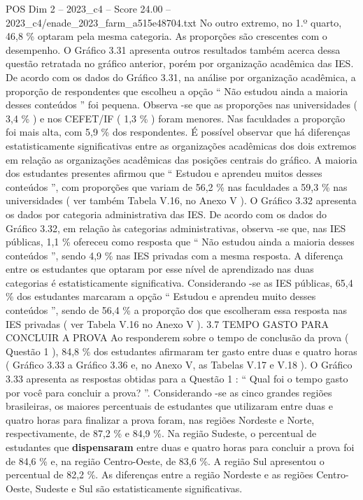 \begin{textsample}{POS Dim 2 – 2023\_c4 – Score 24.00 – 2023\_c4/enade\_2023\_farm\_a515e48704.txt}
No outro extremo, no 1.º quarto, 46,8 \% optaram pela mesma categoria.
As proporções são crescentes com o desempenho.
O Gráfico 3.31 apresenta outros resultados também acerca dessa questão retratada no gráfico anterior, porém por organização acadêmica das IES.
De acordo com os dados do Gráfico 3.31, na análise por organização acadêmica, a proporção de respondentes que escolheu a opção “ Não estudou ainda a maioria desses conteúdos ” foi pequena.
Observa -se que as proporções nas universidades ( 3,4 \% ) e nos CEFET/IF ( 1,3 \% ) foram menores.
Nas faculdades a proporção foi mais alta, com 5,9 \% dos respondentes.
É possível observar que há diferenças estatisticamente significativas entre as organizações acadêmicas dos dois extremos em relação as organizações acadêmicas das posições centrais do gráfico.
A maioria dos estudantes presentes afirmou que “ Estudou e aprendeu muitos desses conteúdos ”, com proporções que variam de 56,2 \% nas faculdades a 59,3 \% nas universidades ( ver também Tabela V.16, no Anexo V ).
O Gráfico 3.32 apresenta os dados por categoria administrativa das IES.
De acordo com os dados do Gráfico 3.32, em relação às categorias administrativas, observa -se que, nas IES públicas, 1,1 \% ofereceu como resposta que “ Não estudou ainda a maioria desses conteúdos ”, sendo 4,9 \% nas IES privadas com a mesma resposta.
A diferença entre os estudantes que optaram por esse nível de aprendizado nas duas categorias é estatisticamente significativa.
Considerando -se as IES públicas, 65,4 \% dos estudantes marcaram a opção “ Estudou e aprendeu muito desses conteúdos ”, sendo de 56,4 \% a proporção dos que escolheram essa resposta nas IES privadas ( ver Tabela V.16 no Anexo V ). 3.7 TEMPO GASTO PARA CONCLUIR A PROVA Ao responderem sobre o tempo de conclusão da prova ( Questão 1 ), 84,8 \% dos estudantes afirmaram ter gasto entre duas e quatro horas ( Gráfico 3.33 a Gráfico 3.36 e, no Anexo V, as Tabelas V.17 e V.18 ).
O Gráfico 3.33 apresenta as respostas obtidas para a Questão 1 : “ Qual foi o tempo gasto por você para concluir a prova? ”.
Considerando -se as cinco grandes regiões brasileiras, os maiores percentuais de estudantes que utilizaram entre duas e quatro horas para finalizar a prova foram, nas regiões Nordeste e Norte, respectivamente, de 87,2 \% e 84,9 \%.
Na região Sudeste, o percentual de estudantes que \textbf{dispensaram} entre duas e quatro horas para concluir a prova foi de 84,6 \% e, na região Centro-Oeste, de 83,6 \%.
A região Sul apresentou o percentual de 82,2 \%.
As diferenças entre a região Nordeste e as regiões Centro-Oeste, Sudeste e Sul são estatisticamente significativas.

\end{textsample}
